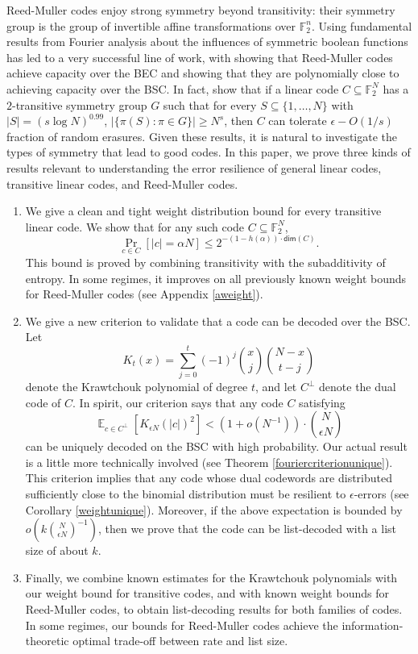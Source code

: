 \documentclass[12pt]{article}
\newcommand{\F}{\mathbb{F}}
\newcommand{\E}{\mathop \mathbb{E}}
\begin{document}
Reed-Muller codes enjoy strong symmetry beyond transitivity: their symmetry group is the group of invertible affine transformations over $\F_2^n$. Using fundamental results from Fourier analysis about the influences of symmetric boolean functions \cite{kahn1988kkl, Talagrand94, Bourgain97} has led to a very successful line of work, with \cite{kudekar2016erasure} showing that Reed-Muller codes achieve capacity over the BEC and \cite{hazla2021polyclose} showing that they are polynomially close to achieving capacity over the BSC. In fact, \cite{kudekar2016erasure} show that if a linear code $C \subseteq \F_2^N$ has a $2$-transitive symmetry group $G$ such that for every $S \subseteq \{1,\dotsc, N\}$ with $|S| = (s \log N)^{0.99}$, $|\{\pi(S): \pi \in G\}| \geq N^s$, then $C$ can tolerate $\epsilon - O(1/s)$ fraction of random erasures. Given these results, it is natural to investigate the types of symmetry that lead to good codes. In this paper, we prove three kinds of results relevant to understanding the error resilience of general linear codes,  transitive linear codes, and Reed-Muller codes.  
\begin{enumerate}
	\item 
We give a clean and tight weight distribution bound for every transitive linear code. We show that for any such code $C \subseteq \F_2^N$, $$\Pr_{c \in C}[|c| = \alpha N] \leq 2^{-(1-h(\alpha)) \cdot \mathsf{dim}(C)}.$$  This bound is proved by combining transitivity with the subadditivity of entropy. In some regimes, it improves on all previously known weight bounds for Reed-Muller codes (see Appendix \ref{aweight}).

\item We give a new criterion to validate that a code can be decoded over the BSC. Let 
$$K_{t}(x)= \sum_{j=0}^t (-1)^j\binom{x}{j}\binom{N-x}{t-j}$$
denote the Krawtchouk polynomial of degree $t$, and let $C^\perp$ denote the dual code of $C$. In spirit, our criterion says that any code $C$ satisfying
$$ \E_{c \in C^\perp}[K_{\epsilon N}(|c|)^2] < (1+o(N^{-1})) \cdot \binom{N}{\epsilon N}$$
can be uniquely decoded on the BSC with high probability. Our actual result is a little more technically involved (see Theorem \ref{fouriercriterionunique}). This criterion implies that any code whose dual codewords are distributed sufficiently close to the binomial distribution must be resilient to $\epsilon$-errors (see Corollary \ref{weightunique}).  Moreover, if the above expectation is bounded by $o(k\binom{N}{\epsilon N}^{-1})$, then we prove that the code can be list-decoded with a list size of about $k$. 

\item Finally, we combine 
known estimates for the Krawtchouk polynomials with our weight bound for transitive codes, and with known weight bounds for Reed-Muller codes, to obtain list-decoding results for both families of codes. In some regimes, our bounds for Reed-Muller codes achieve the information-theoretic optimal trade-off between rate and list size.

\end{enumerate}
\end{document}
